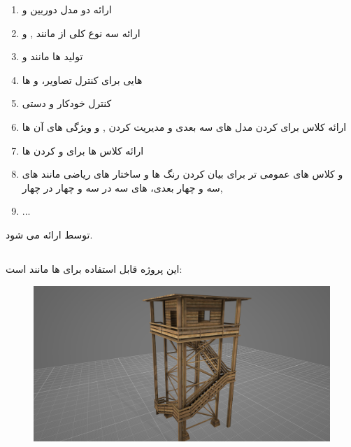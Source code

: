 \documentclass[a4paper, 12pt]{report}
\begin{document}
    \begin{persian}
    \begin{enumerate}
      \item ارائه دو مدل دوربین   و 
      \item ارائه سه نوع کلی از  مانند ,  و 
      \item تولید  ها مانند  و 
      \item {} هایی برای کنترل تصاویر،  و  ها
      \item  کنترل خودکار و دستی 
      \item ارائه کلاس  برای  کردن مدل های سه بعدی و مدیریت کردن ,  و ویژگی های آن ها
      \item ارائه کلاس ها برای  و  کردن  ها
      \item و کلاس های عمومی تر برای بیان کردن رنگ ها و ساختار های ریاضی مانند  های سه و چهار بعدی،  های سه در سه و چهار در چهار, 
      \item ...
    \end{enumerate}
\end{persian}

    توسط  ارائه می شود.\par

    \newpage
    \subsection{}
    این پروژه قابل استفاده برای  ها مانند  است:
\begin{figure}[H]
    \centering
    \href{https://github.com/devprofile98/shm}{
        \includegraphics[width=13cm]{images/archerym3d.png}
    }
    \caption{\fontsize{11pt}{1.0cm}\zarbold\textbf{}}
    \label{fig:my_label}
\end{figure}
\end{document}
